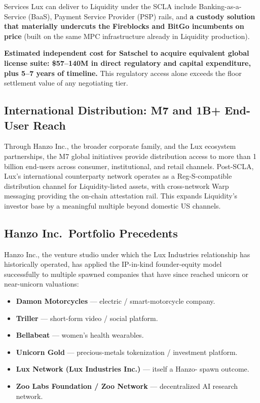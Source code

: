 \documentclass[11pt,letterpaper]{article}
\begin{document}
Services Lux can deliver to Liquidity under the SCLA include
Banking-as-a-Service (BaaS), Payment Service Provider (PSP) rails,
and \textbf{a custody solution that materially undercuts the
Fireblocks and BitGo incumbents on price} (built on the same MPC
infrastructure already in Liquidity production).

\textbf{Estimated independent cost for Satschel to acquire equivalent
global license suite: \$57--140M in direct regulatory and capital
expenditure, plus 5--7 years of timeline.} This regulatory access
alone exceeds the floor settlement value of any negotiating tier.

\subsection*{International Distribution: M7 and 1B+ End-User Reach}

Through Hanzo Inc., the broader corporate family, and the Lux
ecosystem partnerships, the M7 global initiatives provide
distribution access to more than 1 billion end-users across consumer,
institutional, and retail channels. Post-SCLA, Lux's international
counterparty network operates as a Reg-S-compatible distribution
channel for Liquidity-listed assets, with cross-network Warp messaging
providing the on-chain attestation rail. This expands Liquidity's
investor base by a meaningful multiple beyond domestic US channels.

\subsection*{Hanzo Inc.\ Portfolio Precedents}

Hanzo Inc., the venture studio under which the Lux Industries
relationship has historically operated, has applied the IP-in-kind
founder-equity model successfully to multiple spawned companies
that have since reached unicorn or near-unicorn valuations:

\begin{itemize}[leftmargin=1.5em,itemsep=0.1em]
\item \textbf{Damon Motorcycles} --- electric / smart-motorcycle company.
\item \textbf{Triller} --- short-form video / social platform.
\item \textbf{Bellabeat} --- women's health wearables.
\item \textbf{Unicorn Gold} --- precious-metals tokenization /
investment platform.
\item \textbf{Lux Network (Lux Industries Inc.)} --- itself a Hanzo-
spawn outcome.
\item \textbf{Zoo Labs Foundation / Zoo Network} --- decentralized AI
research network.
\end{itemize}
\end{document}
